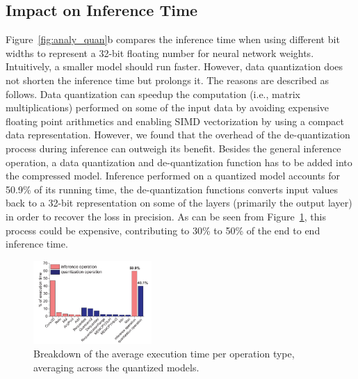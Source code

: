 \subsection{Impact on Inference Time\label{sec:time}}
 Figure~\ref{fig:analy_quan}b compares the inference time when using different bit
widths to represent a 32-bit floating number for neural network weights. Intuitively, a smaller model should run faster. However, data
quantization does not shorten the inference time but prolongs it. The reasons are described as follows. Data quantization can speedup the
computation (i.e., matrix multiplications) performed on some of the input data by avoiding expensive floating point arithmetics and
enabling SIMD vectorization by using a compact data representation. However, we found that the overhead of the de-quantization process
during inference can outweigh its benefit. Besides the general inference operation, a data quantization and de-quantization function has to
be added into the compressed model. Inference performed on a quantized model accounts for 50.9\% of its running time, the de-quantization
functions converts input values back to a 32-bit representation on some of the layers (primarily the output layer) in order to recover the
loss in precision. As can be seen from Figure~\ref{fig:breakdown}, this process could be expensive, contributing to 30\% to 50\% of the end
to end inference time.

\begin{figure}
\begin{center}
\includegraphics[width=0.4\textwidth]{figure/breakdown4.pdf}
\end{center}
\caption{Breakdown of the average execution time per operation type, averaging across the quantized models.}
\vspace{-3mm}
\label{fig:breakdown}
\end{figure}



